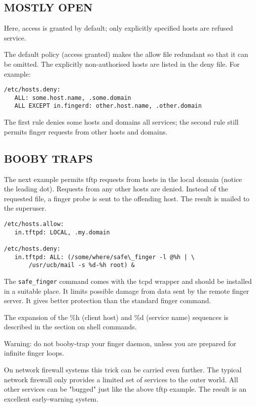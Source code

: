 \documentclass[11pt,twoside,a4paper]{book}
\begin{document}
\subsection*{MOSTLY OPEN}

Here, access is granted by default; only explicitly specified hosts
are refused service.

The default policy (access granted) makes the allow file redundant so
that it can be omitted.  The explicitly non-authorised hosts are
listed in the deny file. For example:

{\small
\begin{verbatim}
/etc/hosts.deny:
   ALL: some.host.name, .some.domain
   ALL EXCEPT in.fingerd: other.host.name, .other.domain
\end{verbatim}
}

The first rule denies some hosts and domains all services; the second
rule still permits finger requests from other hosts and domains.


\subsection*{BOOBY TRAPS}

The next example permits tftp requests from hosts in the local domain
(notice the leading dot).  Requests from any other hosts are denied.
Instead of the requested file, a finger probe is sent to the offending
host. The result is mailed to the superuser.

{\small
\begin{verbatim}
/etc/hosts.allow:
   in.tftpd: LOCAL, .my.domain

/etc/hosts.deny:
   in.tftpd: ALL: (/some/where/safe\_finger -l @%h | \
       /usr/ucb/mail -s %d-%h root) &
\end{verbatim}
}

The \texttt{safe\_finger} command comes with the tcpd wrapper and
should be installed in a suitable place. It limits possible damage
from data sent by the remote finger server.  It gives better
protection than the standard finger command.

The expansion of the \%h (client host) and \%d (service name)
sequences is described in the section on shell commands.

Warning: do not booby-trap your finger daemon, unless you are prepared
for infinite finger loops.

On network firewall systems this trick can be carried even further.
The typical network firewall only provides a limited set of services
to the outer world. All other services can be "bugged" just like the
above tftp example. The result is an excellent early-warning system.
\end{document}
